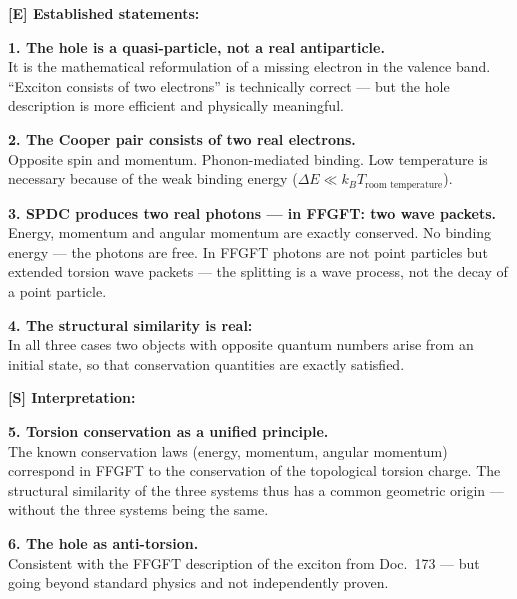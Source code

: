 \begin{conclusionBox}

\textbf{[E] Established statements:}

\textbf{1. The hole is a quasi-particle, not a real antiparticle.}\\
It is the mathematical reformulation of a missing electron
in the valence band. ``Exciton consists of two electrons'' is
technically correct --- but the hole description is more efficient
and physically meaningful.

\textbf{2. The Cooper pair consists of two real electrons.}\\
Opposite spin and momentum. Phonon-mediated binding.
Low temperature is necessary because of the weak binding energy
($\Delta E \ll k_BT_\text{room temperature}$).

\textbf{3. SPDC produces two real photons --- in FFGFT: two wave packets.}\\
Energy, momentum and angular momentum are exactly conserved.
No binding energy --- the photons are free.
In FFGFT photons are not point particles but
extended torsion wave packets --- the splitting
is a wave process, not the decay of a point particle.

\textbf{4. The structural similarity is real:}\\
In all three cases two objects with
opposite quantum numbers arise from an initial state,
so that conservation quantities are exactly satisfied.

\medskip

\textbf{[S] Interpretation:}

\textbf{5. Torsion conservation as a unified principle.}\\
The known conservation laws (energy, momentum, angular momentum)
correspond in FFGFT to the conservation of the topological
torsion charge. The structural similarity of the three systems
thus has a common geometric origin ---
without the three systems being the same.

\textbf{6. The hole as anti-torsion.}\\
Consistent with the FFGFT description of the exciton
from Doc.~173 --- but going beyond standard physics
and not independently proven.
\end{conclusionBox}


